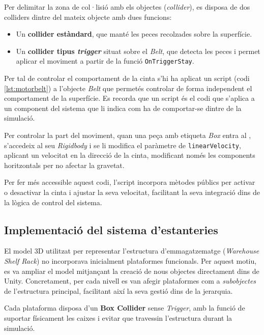 \documentclass[a4paper,11pt,DIV=13,headings=normal,abstract=true,twoside=semi]{article}
\begin{document}
Per delimitar la zona de col·lisió amb els objectes (\textit{collider}), es disposa de dos colliders dintre del mateix objecte amb dues funcions: 

\begin{itemize}
\item Un \textbf{collider estàndard}, que manté les peces recolzades sobre la superfície.
\item Un \textbf{collider tipus \textit{trigger}} situat sobre el \textit{Belt}, que detecta les peces i permet aplicar el moviment a partir de la funció \texttt{OnTriggerStay}.
\end{itemize}

Per tal de controlar el comportament de la cinta s'hi ha aplicat un script (codi \ref{lst:motorbelt}) a l'objecte \textit{Belt} que permetés controlar de forma independent el comportament de la superfície. Es recorda que un script és el codi que s'aplica a un component del sistema que li indica com ha de comportar-se dintre de la simulació. 

Per controlar la part del moviment, quan una peça amb etiqueta \textit{Box} \cite{UnityTags2023} entra al , s'accedeix al seu \textit{Rigidbody} \cite{UnityRigidbody} i se li modifica el paràmetre de \texttt{linearVelocity}, aplicant un velocitat en la direcció de la cinta, modificant només les components horitzontals per no afectar la gravetat.

Per fer més accessible aquest codi, l'script incorpora mètodes públics per activar o desactivar la cinta i ajustar la seva velocitat, facilitant la seva integració dins de la lògica de control del sistema.

\subsection{Implementació del sistema d'estanteries}


El model 3D utilitzat per representar l'estructura d'emmagatzematge (\textit{Warehouse Shelf Rack}) no incorporava inicialment plataformes funcionals. Per aquest motiu, es va ampliar el model mitjançant la creació de nous objectes directament dins de Unity. Concretament, per cada nivell es van afegir plataformes com a \textit{subobjectes} de l'estructura principal, facilitant així la seva gestió dins de la jerarquia.

Cada plataforma disposa d'un \textbf{Box Collider} sense \textit{Trigger}, amb la funció de suportar físicament les caixes i evitar que travessin l'estructura durant la simulació.
\end{document}
